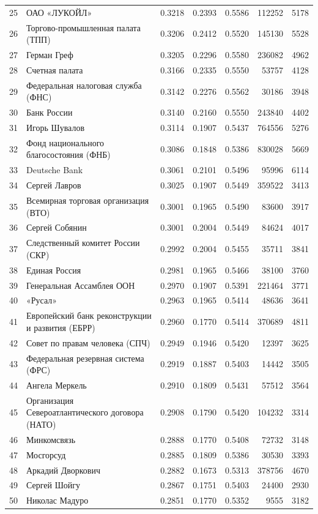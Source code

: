 {\begin{longtable}{r >{\raggedright\arraybackslash}p{4.2cm} S[table-format=1.4] S[table-format=1.4] S[table-format=1.4] r r}
25 & ОАО «ЛУКОЙЛ» & 0.3218 & 0.2393 & 0.5586 & 112252 & 5178 \\
26 & Торгово-промышленная палата (ТПП) & 0.3206 & 0.2412 & 0.5520 & 145130 & 5528 \\
27 & Герман Греф & 0.3205 & 0.2296 & 0.5580 & 236082 & 4962 \\
28 & Счетная палата & 0.3166 & 0.2335 & 0.5550 & 53757 & 4128 \\
29 & Федеральная налоговая служба (ФНС) & 0.3142 & 0.2276 & 0.5562 & 30186 & 3948 \\
30 & Банк России & 0.3140 & 0.2160 & 0.5550 & 243840 & 4402 \\
31 & Игорь Шувалов & 0.3114 & 0.1907 & 0.5437 & 764556 & 5276 \\
32 & Фонд национального благосостояния (ФНБ) & 0.3086 & 0.1848 & 0.5386 & 830028 & 5669 \\
33 & Deutsche Bank & 0.3061 & 0.2101 & 0.5496 & 95996 & 6114 \\
34 & Сергей Лавров & 0.3025 & 0.1907 & 0.5449 & 359522 & 3413 \\
35 & Всемирная торговая организация (ВТО) & 0.3001 & 0.1965 & 0.5490 & 83600 & 3917 \\
36 & Сергей Собянин & 0.3001 & 0.2004 & 0.5449 & 84624 & 4017 \\
37 & Следственный комитет России (СКР) & 0.2992 & 0.2004 & 0.5455 & 35711 & 3841 \\
38 & Единая Россия & 0.2981 & 0.1965 & 0.5466 & 38100 & 3760 \\
39 & Генеральная Ассамблея ООН & 0.2970 & 0.1907 & 0.5391 & 221464 & 3771 \\
40 & «Русал» & 0.2963 & 0.1965 & 0.5414 & 48636 & 3641 \\
41 & Европейский банк реконструкции и развития (ЕБРР) & 0.2960 & 0.1770 & 0.5414 & 370689 & 4811 \\
42 & Совет по правам человека (СПЧ) & 0.2949 & 0.1946 & 0.5420 & 12397 & 3625 \\
43 & Федеральная резервная система (ФРС) & 0.2919 & 0.1887 & 0.5403 & 14442 & 3505 \\
44 & Ангела Меркель & 0.2910 & 0.1809 & 0.5431 & 57512 & 3564 \\
45 & Организация Североатлантического договора (НАТО) & 0.2908 & 0.1790 & 0.5420 & 104232 & 3314 \\
46 & Минкомсвязь & 0.2888 & 0.1770 & 0.5408 & 72732 & 3148 \\
47 & Мосгорсуд & 0.2885 & 0.1809 & 0.5386 & 30530 & 3393 \\
48 & Аркадий Дворкович & 0.2882 & 0.1673 & 0.5313 & 378756 & 4670 \\
49 & Сергей Шойгу & 0.2867 & 0.1751 & 0.5403 & 24400 & 2930 \\
50 & Николас Мадуро & 0.2851 & 0.1770 & 0.5352 & 9555 & 3182 \\
\end{longtable}
}

